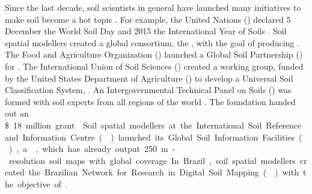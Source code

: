 Since the last decade, soil scientists in general have launched many initiatives to make soil become a hot 
topic \cite{HarteminkEtAl2008}. For example, the United Nations (\WorldSoilDay) declared 5 December the World 
Soil Day and 2015 the International Year of Soils . Soil spatial modellers created a global consortium, the \gsm, with 
the goal of producing . The Food and Agriculture Organization (\fao) launched a Global Soil Partnership (\gsp) for 
. The International Union of Soil 
Sciences (\iussusc) created a working group, funded by the United States Department of Agriculture (\usdausc) 
to develop a Universal Soil Classification System, . An Intergovernmental Technical Panel on Soils (\itps) was formed with soil experts from 
all regions of the world . The \gates{} foundation handed out an \SI{18}[\$]~million grant . Soil spatial modellers 
at the International Soil Reference and Information Centre (\isric) launched its Global Soil Information 
Facilities (\gsif), a , which has already output 
\SI{250}{\m}-resolution soil maps with global coverage. In Brazil, soil spatial modellers created the 
Brazilian Network for Research in Digital Soil Mapping (\redemds) with the objective of .

